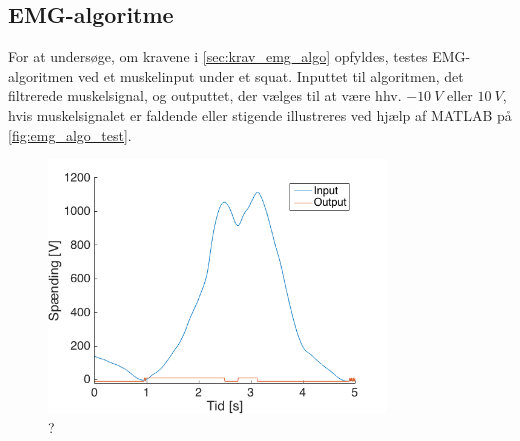 \subsection{EMG-algoritme}
For at undersøge, om kravene i \autoref{sec:krav_emg_algo} opfyldes, testes EMG-algoritmen ved et muskelinput under et squat. Inputtet til algoritmen, det filtrerede muskelsignal, og outputtet, der vælges til at være hhv. $-10~V$ eller $10~V$, hvis muskelsignalet er faldende eller stigende illustreres ved hjælp af MATLAB på \autoref{fig:emg_algo_test}. 

\begin{figure}[H]
\centering
\includegraphics[width=0.8\textwidth]{figures/EMG_algo_test}
\caption{?}
\label{fig:emg_algo_test}
\end{figure}